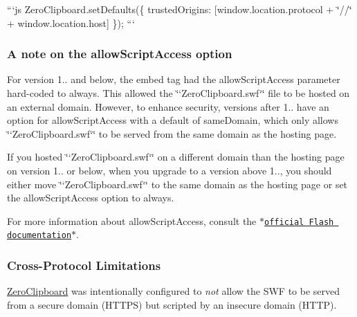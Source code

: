 ```js Zero\-Clipboard.\-set\-Defaults(\{ trusted\-Origins\-: \mbox{[}window.\-location.\-protocol + \char`\"{}//\char`\"{} + window.\-location.\-host\mbox{]} \}); ```

\subsubsection*{A note on the {\ttfamily allow\-Script\-Access} option}

For version 1.. and below, the {\ttfamily embed} tag had the {\ttfamily allow\-Script\-Access} parameter hard-\/coded to {\ttfamily always}. This allowed the \char`\"{}`\-Zero\-Clipboard.\-swf`\char`\"{} file to be hosted on an external domain. However, to enhance security, versions after 1.. have an option for {\ttfamily allow\-Script\-Access} with a default of {\ttfamily same\-Domain}, which only allows \char`\"{}`\-Zero\-Clipboard.\-swf`\char`\"{} to be served from the same domain as the hosting page.

If you hosted \char`\"{}`\-Zero\-Clipboard.\-swf`\char`\"{} on a different domain than the hosting page on version 1.. or below, when you upgrade to a version above 1.., you should either move \char`\"{}`\-Zero\-Clipboard.\-swf`\char`\"{} to the same domain as the hosting page or set the {\ttfamily allow\-Script\-Access} option to {\ttfamily always}.

For more information about {\ttfamily allow\-Script\-Access}, consult the $\ast$\href{http://helpx.adobe.com/flash/kb/control-access-scripts-host-web.html}{\tt official Flash documentation}$\ast$.

\subsubsection*{Cross-\/\-Protocol Limitations}

\hyperlink{class_zero_clipboard}{Zero\-Clipboard} was intentionally configured to {\itshape not} allow the S\-W\-F to be served from a secure domain (H\-T\-T\-P\-S) but scripted by an insecure domain (H\-T\-T\-P).

